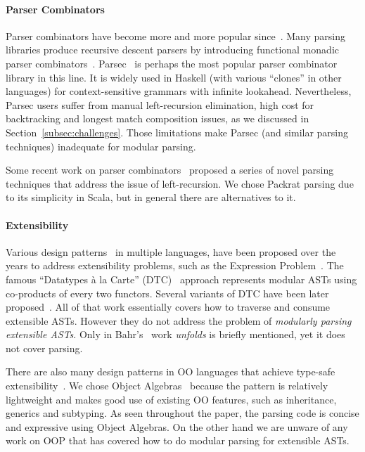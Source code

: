
\paragraph{Parser Combinators} Parser combinators have become more and more
popular since~\cite{burge1975,Wadler1985}. Many parsing libraries produce recursive descent
parsers by introducing functional monadic
parser combinators~\cite{nott237}. Parsec~\cite{Leijen2001} is
perhaps the most popular parser combinator library in this line.
It is widely used in Haskell (with various ``clones'' in other languages)
for context-sensitive grammars with infinite lookahead. Nevertheless,
Parsec users suffer from manual left-recursion elimination,
high cost for backtracking and longest match composition issues,
as we discussed in Section~\ref{subsec:challenges}. Those limitations make Parsec
(and similar parsing techniques) inadequate for modular parsing.

Some recent work on parser
combinators~\cite{Ford2002,Might2011,Frost2008} proposed a series of
novel parsing techniques that address the issue of
left-recursion. We chose Packrat parsing due to its simplicity in Scala,
but in general there are alternatives to it.

\paragraph{Extensibility} Various design patterns~\cite{gamma1995design} in multiple
languages, have been proposed over the years to address extensibility
problems, such as the Expression Problem~\cite{wadler1998expression}.
The famous ``Datatypes \`a
la Carte'' (DTC)~\cite{swierstra2008data} approach represents modular ASTs using co-products
of every two functors. Several variants of DTC have been later proposed~\cite{Bahr2011,Bahr2014,Oliveira2015}.
All of that work essentially covers how to traverse and
consume extensible ASTs. However they do not
address the problem of \emph{modularly
parsing extensible ASTs}. Only in Bahr's~\cite{Bahr2011} work \emph{unfolds} is briefly mentioned,
yet it does not cover parsing.

There are also many design patterns in OO languages that achieve
type-safe extensibility~\cite{torgersen2004expression,odersky2005independently,oliveira2009modular,Oliveira:2012,wang2016expression}. We chose Object Algebras~\cite{Oliveira:2012} because the pattern is
relatively lightweight and makes good use of existing OO features,
such as inheritance, generics and subtyping. As seen throughout the paper,
the parsing code is concise and expressive using Object Algebras.
On the other hand we are unware of any work on OOP
that has covered how to do modular parsing for extensible ASTs.

